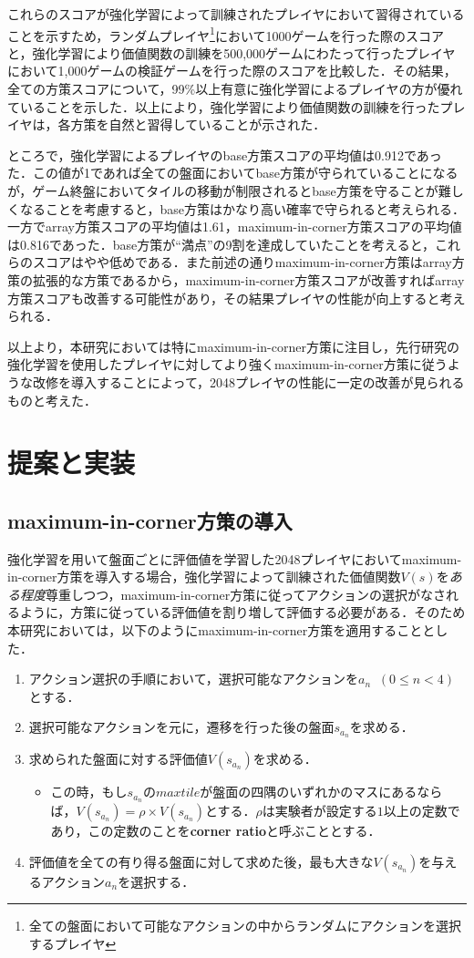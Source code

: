 \documentclass{suribt}
\begin{document}
これらのスコアが強化学習によって訓練されたプレイヤにおいて習得されていることを示すため，ランダムプレイヤ\footnote{全ての盤面において可能なアクションの中からランダムにアクションを選択するプレイヤ}において1000ゲームを行った際のスコアと，強化学習により価値関数の訓練を500,000ゲームにわたって行ったプレイヤにおいて1,000ゲームの検証ゲームを行った際のスコアを比較した．その結果，全ての方策スコアについて，99\%以上有意に強化学習によるプレイヤの方が優れていることを示した．以上により，強化学習により価値関数の訓練を行ったプレイヤは，各方策を自然と習得していることが示された．

ところで，強化学習によるプレイヤのbase方策スコアの平均値は0.912であった．この値が1であれば全ての盤面においてbase方策が守られていることになるが，ゲーム終盤においてタイルの移動が制限されるとbase方策を守ることが難しくなることを考慮すると，base方策はかなり高い確率で守られると考えられる．一方でarray方策スコアの平均値は1.61，maximum-in-corner方策スコアの平均値は0.816であった．base方策が“満点”の9割を達成していたことを考えると，これらのスコアはやや低めである．また前述の通りmaximum-in-corner方策はarray方策の拡張的な方策であるから，maximum-in-corner方策スコアが改善すればarray方策スコアも改善する可能性があり，その結果プレイヤの性能が向上すると考えられる．

以上より，本研究においては特にmaximum-in-corner方策に注目し，先行研究の強化学習を使用したプレイヤに対してより強くmaximum-in-corner方策に従うような改修を導入することによって，2048プレイヤの性能に一定の改善が見られるものと考えた．

\chapter{提案と実装}
\section{maximum-in-corner方策の導入}
強化学習を用いて盤面ごとに評価値を学習した2048プレイヤにおいてmaximum-in-corner方策を導入する場合，強化学習によって訓練された価値関数$V(s)$を\emph{ある程度}尊重しつつ，maximum-in-corner方策に従ってアクションの選択がなされるように，方策に従っている評価値を割り増して評価する必要がある．そのため本研究においては，以下のようにmaximum-in-corner方策を適用することとした．

\begin{enumerate}
\item アクション選択の手順において，選択可能なアクションを$a_n \;\; (0 \leq n < 4)$とする．
\item 選択可能なアクションを元に，遷移を行った後の盤面$s_{a_n}$を求める．
\item 求められた盤面に対する評価値$V(s_{a_n})$を求める．
\begin{itemize}
\item この時，もし$s_{a_n}$の$maxtile$が盤面の四隅のいずれかのマスにあるならば，$V(s_{a_n}) = {\rho} \times V(s_{a_n})$とする．${\rho}$は実験者が設定する$1$以上の定数であり，この定数のことを\textbf{corner ratio}と呼ぶこととする．
\end{itemize}
\item 評価値を全ての有り得る盤面に対して求めた後，最も大きな$V(s_{a_n})$を与えるアクション$a_n$を選択する．
\end{enumerate}
\end{document}
